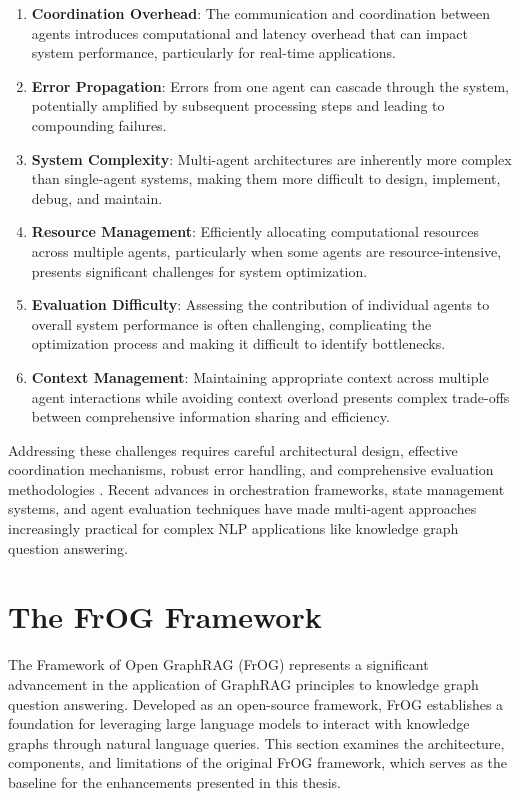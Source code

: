 \begin{enumerate}
    \item \textbf{Coordination Overhead}: The communication and coordination between agents introduces computational and latency overhead that can impact system performance, particularly for real-time applications.
    
    \item \textbf{Error Propagation}: Errors from one agent can cascade through the system, potentially amplified by subsequent processing steps and leading to compounding failures.
    
    \item \textbf{System Complexity}: Multi-agent architectures are inherently more complex than single-agent systems, making them more difficult to design, implement, debug, and maintain.
    
    \item \textbf{Resource Management}: Efficiently allocating computational resources across multiple agents, particularly when some agents are resource-intensive, presents significant challenges for system optimization.
    
    \item \textbf{Evaluation Difficulty}: Assessing the contribution of individual agents to overall system performance is often challenging, complicating the optimization process and making it difficult to identify bottlenecks.
    
    \item \textbf{Context Management}: Maintaining appropriate context across multiple agent interactions while avoiding context overload presents complex trade-offs between comprehensive information sharing and efficiency.
\end{enumerate}

Addressing these challenges requires careful architectural design, effective coordination mechanisms, robust error handling, and comprehensive evaluation methodologies \citep{langchain2025langgraph}. Recent advances in orchestration frameworks, state management systems, and agent evaluation techniques have made multi-agent approaches increasingly practical for complex NLP applications like knowledge graph question answering.



\section{The FrOG Framework}
\label{sec:frog}
The Framework of Open GraphRAG (FrOG) \citep{ongris2024frog} represents a significant advancement in the application of GraphRAG principles to knowledge graph question answering. Developed as an open-source framework, FrOG establishes a foundation for leveraging large language models to interact with knowledge graphs through natural language queries. This section examines the architecture, components, and limitations of the original FrOG framework, which serves as the baseline for the enhancements presented in this thesis.

